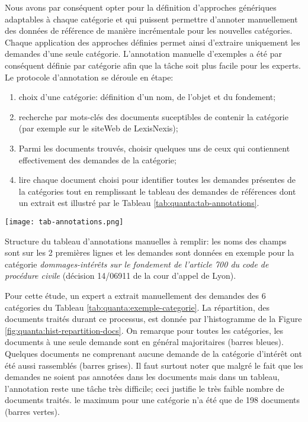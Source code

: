 Nous avons par conséquent opter pour la définition d'approches génériques adaptables à chaque catégorie et qui puissent permettre d'annoter manuellement des données de référence de manière incrémentale pour les nouvelles catégories. Chaque application des approches définies permet ainsi d'extraire uniquement les demandes d'une seule catégorie. L'annotation manuelle d'exemples a été par conséquent définie par catégorie afin que la tâche soit plus facile pour les experts. Le protocole d'annotation se déroule en étape: 
\begin{enumerate}
    \item choix d'une catégorie: définition d'un nom, de l'objet et du fondement;
    \item recherche par mots-clés des documents suceptibles de contenir la catégorie (par exemple sur le siteWeb de LexisNexis);
    \item Parmi les documents trouvés, choisir quelques uns de ceux qui contiennent effectivement des demandes de la catégorie; 
    \item lire chaque document choisi pour identifier toutes les demandes présentes de la catégories tout en remplissant le tableau des demandes de références dont un extrait est illustré par le Tableau \ref{tab:quanta:tab-annotations}.
\end{enumerate}

\begin{table}[!htb]
\texttt{[image: tab-annotations.png]}
\caption{Structure du tableau d'annotations manuelles à remplir: les noms des champs sont sur les 2 premières lignes et les demandes sont données en exemple pour la catégorie \textit{dommages-intérêts sur le fondement de l'article 700 du code de procédure civile} (décision 14/06911 de la cour d'appel de Lyon).} \label{tab:quanta:tab-annotations}
\end{table}

Pour cette étude, un expert a extrait manuellement des demandes des 6 catégories du Tableau \ref{tab:quanta:exemple-categorie}. La répartition, des documents traités durant ce processus, est donnée par l'histogramme de la Figure \ref{fig:quanta:hist-repartition-docs}. On remarque pour toutes les catégories, les documents à une seule demande sont en général majoritaires (barres bleues). Quelques documents ne comprenant aucune demande de la catégorie d'intérêt ont été aussi rassemblés (barres grises). Il faut surtout noter que malgré le fait que les demandes ne soient pas annotées dans les documents mais dans un tableau, l'annotation reste une tâche très difficile; ceci justifie le très faible nombre de documents traités. le maximum pour une catégorie n'a été que de 198 documents (barres vertes).

